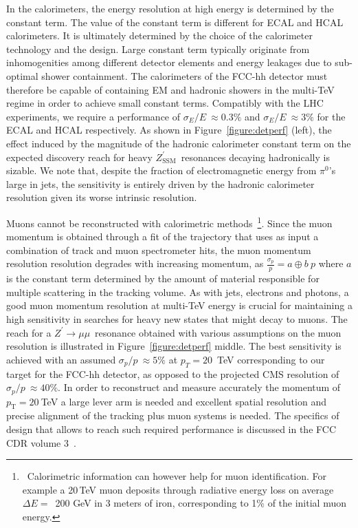 \documentclass[a4paper,11pt]{article}
\newcommand{\ZpSSM}{\ensuremath{Z^{\prime}_{\mathrm{SSM}}}}
\newcommand*{\Zpmumu}{\ensuremath{Z^{\prime}\rightarrow \mu\mu}}
\newcommand{\pt}{\ensuremath{p_{\text{T}}}}
\begin{document}
In the calorimeters, the energy resolution at high energy is determined by the constant term. The value of the constant term is different for ECAL and HCAL calorimeters. It is ultimately determined by the choice of the calorimeter technology and the design. Large constant term typically originate from inhomogenities among different detector elements and energy leakages due to sub-optimal shower containment. The calorimeters of the FCC-hh detector must therefore be capable of containing EM and hadronic showers in the multi-TeV regime in order to achieve small constant terms.
Compatibly with the LHC experiments, we require a performance of $\sigma_E/E~ \approx 0.3 \%$ and $\sigma_E/E~ \approx 3\%$ for the ECAL and HCAL respectively. As shown in Figure~\ref{figure:detperf} (left), the effect induced by the magnitude of the hadronic calorimeter constant term on the expected discovery reach for heavy \ZpSSM\ resonances decaying hadronically is sizable. We note that, despite the fraction of electromagnetic energy from $\pi^0$'s large in jets, the sensitivity is entirely driven by the hadronic calorimeter resolution given its worse intrinsic resolution.

Muons cannot be reconstructed with calorimetric methods~\footnote{~Calorimetric information can however help for muon identification. For example a 20\,TeV muon deposits through radiative energy loss on average $\Delta E=$~200 GeV in 3 meters of iron, corresponding to 1\% of the initial muon energy.}. Since the muon momentum is obtained through a fit of the trajectory that uses as input a combination of track and muon spectrometer hits, the muon momentum resolution resolution degrades with increasing momentum, as $\frac{\sigma_p}{p}= a \oplus b~p$ where $a$ is the constant term determined by the amount of material responsible for multiple scattering in the tracking volume. As with jets, electrons and photons, a good muon momentum resolution at multi-TeV energy is crucial for maintaining a high sensitivity in searches for heavy new states that might decay to muons. The reach for a \Zpmumu\ resonance obtained with various assumptions on the muon resolution is illustrated in Figure~\ref{figure:detperf} middle. The best sensitivity is achieved with an assumed $\sigma_p/p~ \approx 5\%$ at $p_T = 20$~TeV corresponding to our target for the FCC-hh detector, as opposed to the projected CMS resolution of $\sigma_p/p~\approx 40\%$. In order to reconstruct and measure accurately the momentum of $\pt=20~$TeV a large lever arm is needed and excellent spatial resolution and precise alignment of the tracking plus muon systems is needed. The specifics of design that allows to reach such required performance is discussed in the FCC CDR volume 3~\cite{cdr_volume3}.
\end{document}
